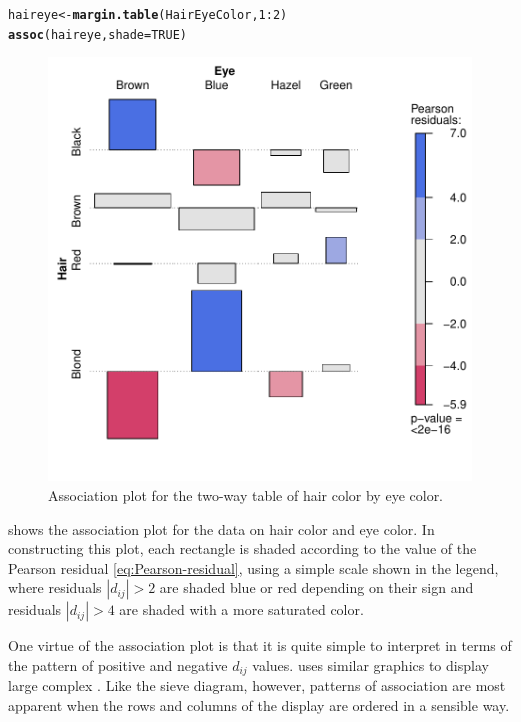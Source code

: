 \documentclass[11pt]{book}\usepackage[]{graphicx}\usepackage[]{color}
\makeatletter
\newcommand{\hlnum}[1]{\textcolor[rgb]{0.686,0.059,0.569}{#1}}%
\newcommand{\hlopt}[1]{\textcolor[rgb]{0,0,0}{#1}}%
\newcommand{\hlstd}[1]{\textcolor[rgb]{0.345,0.345,0.345}{#1}}%
\newcommand{\hlkwb}[1]{\textcolor[rgb]{0.69,0.353,0.396}{#1}}%
\newcommand{\hlkwc}[1]{\textcolor[rgb]{0.333,0.667,0.333}{#1}}%
\newcommand{\hlkwd}[1]{\textcolor[rgb]{0.737,0.353,0.396}{\textbf{#1}}}%
\newenvironment{kframe}{%
 \def\at@end@of@kframe{}%
 \ifinner\ifhmode%
  \def\at@end@of@kframe{\end{minipage}}%
  \begin{minipage}{\columnwidth}%
 \fi\fi%
 \def\FrameCommand##1{\hskip\@totalleftmargin \hskip-\fboxsep
 \colorbox{shadecolor}{##1}\hskip-\fboxsep
     \hskip-\linewidth \hskip-\@totalleftmargin \hskip\columnwidth}%
 \MakeFramed {\advance\hsize-\width
   \@totalleftmargin\z@ \linewidth\hsize
   \@setminipage}}%
 {\par\unskip\endMakeFramed%
 \at@end@of@kframe}
\newenvironment{knitrout}{}{} %
\renewenvironment{knitrout}{\small\renewcommand{\baselinestretch}{.85}}{} %
\makeatother
\begin{document}
\begin{knitrout}
\color{fgcolor}\begin{kframe}
\begin{alltt}
\hlstd{haireye} \hlkwb{<-} \hlkwd{margin.table}\hlstd{(HairEyeColor,} \hlnum{1}\hlopt{:}\hlnum{2}\hlstd{)}
\hlkwd{assoc}\hlstd{(haireye,} \hlkwc{shade}\hlstd{=}\hlnum{TRUE}\hlstd{)}
\end{alltt}
\end{kframe}\begin{figure}[htbp]


\centerline{\includegraphics[width=.6\textwidth]{ch04/fig/HE-assoc} }

\caption[Association plot for the two-way table of hair color by eye color]{Association plot for the two-way table of hair color by eye color.\label{fig:HE-assoc}}
\end{figure}


\end{knitrout}

 shows the association plot for the data on
hair color and eye color.
In constructing this plot, each rectangle is shaded according to
the value of the Pearson residual \eqref{eq:Pearson-residual},
using a simple scale shown in the legend, where residuals
$|d_{ij}| > 2$ are shaded blue or red depending on their sign
and residuals $|d_{ij}| > 4$
are shaded with a more saturated color.

One virtue of the association plot is that it is quite simple to
interpret in terms of the pattern of
positive and negative  $d_{ij}$ values.
\citet{Bertin:81} uses similar graphics to display large complex
\ctabs.  Like the sieve diagram, however, patterns of association
are most apparent when the rows and columns of the display are ordered
in a sensible way.
\end{document}
